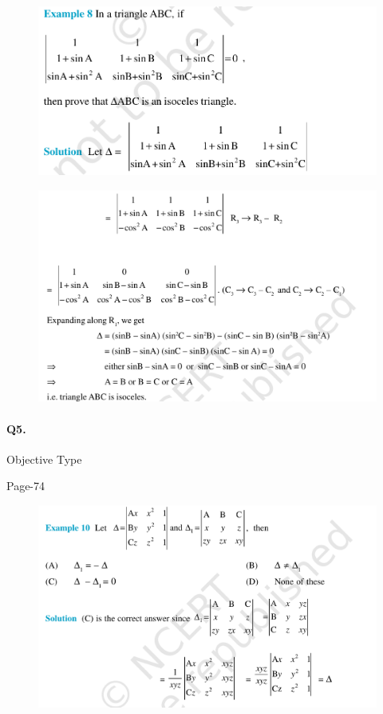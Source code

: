 \documentclass{article}
\begin{document}
\begin{figure}[H]
    \includegraphics[scale=0.5]{determinants_l2_ps_41.png}
\end{figure}
\begin{figure}[H]
    \includegraphics[scale=0.5]{determinants_l2_ps_42.png}
\end{figure}
\clearpage
\paragraph{Q5.}Objective Type
\begin{flushright}
Page-74
\end{flushright}

\begin{figure}[H]
    \includegraphics[scale=0.5]{determinants_l2_ps_5.png}
\end{figure}
\clearpage
\end{document}
